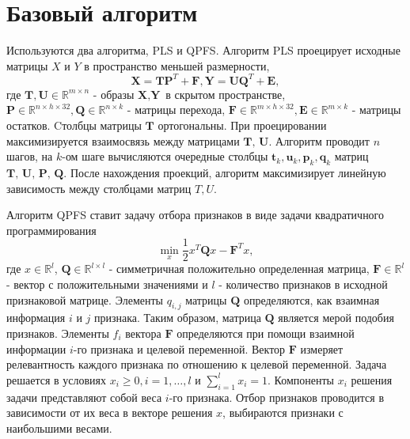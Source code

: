 \documentclass[12pt,twoside]{article}
\begin{document}
\section{Базовый алгоритм}

Используются два алгоритма, PLS и QPFS. 
Алгоритм PLS проецирует исходные матрицы $X$ и $Y$ в пространство меньшей размерности, $$\textbf{X} = \textbf{TP}^T + \textbf{F}, \textbf{Y} = \textbf{UQ}^T + \textbf{E} ,$$ где $\textbf{T}, \textbf{U} \in \mathbb{R}^{m \times n}$ 
- образы $\textbf{X}, \textbf{Y}$ в скрытом пространстве, 
$\textbf{P} \in \mathbb{R}^{n \times h \times 32}, \textbf{Q} \in \mathbb{R}^{n \times k}$ - матрицы перехода, 
$\textbf{F} \in \mathbb{R}^{m \times h \times 32}, \textbf{E} \in \mathbb{R}^{m \times k}$ - матрицы остатков. Cтолбцы матрицы $\textbf{T}$ ортогональны. При проецировании максимизируется взаимосвязь между матрицами $\textbf{T, U}$. Алгоритм проводит $n$ шагов, на $k$-ом шаге вычисляются очередные столбцы $\textbf{t}_k,\textbf{u}_k,\textbf{p}_k,\textbf{q}_k$ матриц $\textbf{T, U, P, Q}.$
После нахождения проекций, алгоритм максимизирует линейную зависимость между столбцами матриц $T, U.$

Алгоритм QPFS ставит задачу отбора признаков в виде задачи квадратичного программирования $$\min_x \frac1{2} x^T \textbf{Q}x- \textbf{F}^Tx ,$$
где $x \in \mathbb{R}^l$, $\textbf{Q} \in \mathbb{R}^{l \times l}$ - симметричная положительно определенная матрица, $\textbf{F} \in \mathbb{R}^l$ - вектор с положительными значениями и $l$ - количество признаков в исходной признаковой матрице. Элементы $q_{i,j}$ матрицы $\textbf{Q}$ определяются, как взаимная информация $i$ и $j$ признака. Таким образом, матрица $\textbf{Q}$ является мерой подобия признаков. Элементы $f_i$ вектора $\textbf{F}$ определяются при помощи взаимной информации $i$-го признака и целевой переменной. Вектор $\textbf{F}$ измеряет релевантность каждого признака по отношению к целевой переменной. Задача решается в условиях $x_i \geq 0, i = 1, \dots, l$ и $\sum\limits^l_{i=1} x_i = 1$. Компоненты $x_i$ решения задачи представляют собой веса $i$-го признака. Отбор признаков проводится в зависимости от их веса в векторе решения $x$, выбираются признаки с наибольшими весами.

{}

\end{document}

